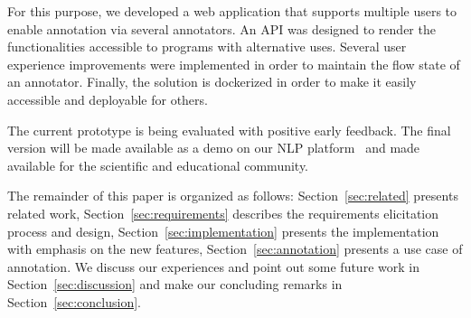 For this purpose, we developed a web application that supports multiple users to enable annotation via several annotators.
An API was designed to render the functionalities accessible to programs with alternative uses.
Several user experience improvements were implemented in order to maintain the flow state of an annotator.
Finally, the solution is dockerized in order to make it easily accessible and deployable for others. 

The current prototype is being evaluated with positive early feedback. 
The final version will be made available as a demo on our NLP platform~\cite{DIP} and made available for the scientific and educational community. 

The remainder of this paper is organized as follows: 
Section~\ref{sec:related} presents related work, 
Section~\ref{sec:requirements} describes the requirements elicitation process and design, 
Section~\ref{sec:implementation} presents the implementation with emphasis on the new features, 
Section~\ref{sec:annotation} presents a use case of annotation.
We discuss our experiences and point out some future work in Section~\ref{sec:discussion} and make our concluding remarks in Section~\ref{sec:conclusion}.
